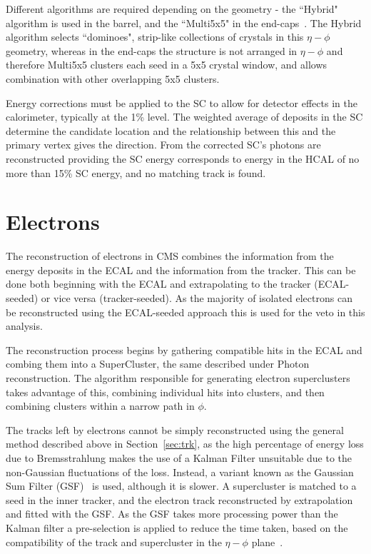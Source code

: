  Different algorithms are required depending on the geometry - the ``Hybrid" algorithm is used in the barrel, and the ``Multi5x5" in the end-caps~\cite{EGM-10-005}. The Hybrid algorithm selects ``dominoes", strip-like collections of crystals in this $\eta - \phi$ geometry, whereas in the end-caps the structure is not arranged in $\eta - \phi$ and therefore Multi5x5 clusters each seed in a 5x5 crystal window, and allows combination with other overlapping 5x5 clusters.

Energy corrections must be applied to the SC to allow for detector effects in the calorimeter, typically at the 1\% level. The weighted average of deposits in the SC determine the candidate location and the relationship between this and the primary vertex gives the direction. From the corrected SC's photons are reconstructed providing the SC energy corresponds to energy in the HCAL of no more than 15\% SC energy, and no matching track is found. 

\section{Electrons}

The reconstruction of electrons in CMS combines the information from the energy deposits in the ECAL and the information from the tracker. This can be done both beginning with the ECAL and extrapolating to the tracker (ECAL-seeded) or vice versa (tracker-seeded). As the majority of isolated electrons can be reconstructed using the ECAL-seeded approach this is used for the veto in this analysis. 

The reconstruction process begins by gathering compatible hits in the ECAL and combing them into a SuperCluster, the same described under Photon reconstruction. The algorithm responsible for generating electron superclusters takes advantage of this, combining individual hits into clusters, and then combining clusters within a narrow path in $\phi$. 

The tracks left by electrons cannot be simply reconstructed using the general method described above in Section~\ref{sec:trk}, as the high percentage of energy loss due to Bremsstrahlung makes the use of a Kalman Filter unsuitable due to the non-Gaussian fluctuations of the loss. Instead, a variant known as the Gaussian Sum Filter (GSF)~\cite{gsf} is used, although it is slower. A supercluster is matched to a seed in the inner tracker, and the electron track reconstructed by extrapolation and fitted with the GSF.  As the GSF takes more processing power than the Kalman filter a pre-selection is applied to reduce the time taken, based on the compatibility of the track and supercluster in the $\eta - \phi$ plane~\cite{EGM-10-004}.



